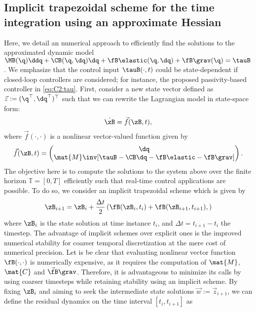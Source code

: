 \subsection{Implicit trapezoidal scheme for the time integration using an approximate Hessian}
\label{app:C2:timeint}
\noindent Here, we detail an numerical approach to efficiently find the solutions to the approximated dynamic model $\MB(\q)\ddq + \CB(\q,\dq)\dq + \fB\elastic(\q,\dq) +  \fB\grav(\q) = \tauB$. We emphasize that the control input $\tauB(\cdot,t)$ could be state-dependent if closed-loop controllers are considered; for instance, the proposed passivity-based controller in \eqref{eq:C2:tau}. First, consider a new state vector defined as $\vec{z} := ( \q^\top,\dq^\top )^\top$ such that we can rewrite the Lagrangian model in state-space form:
%
\begin{equation}
\dot{\zB} = \vec{f}(\zB,t),
\end{equation}
%
where $\vec{f}(\cdot,\cdot)$ is a nonlinear vector-valued function given by
%
\begin{equation}
\vec{f}(\zB,t) = \begin{pmatrix} \dq \\ \mat{M}\inv [\tauB - \CB\dq - \fB\elastic- \fB\grav] \end{pmatrix}.
\end{equation}
%
The objective here is to compute the solutions to the system above over the finite horizon $\mathbb{T} = [0,T]$ efficiently such that real-time control applications are possible. To do so, we consider an implicit trapezoidal scheme which is given by
%
\begin{equation}
\zB_{i+1} = \zB_{i} + \frac{\Delta t}{2} \left( \fB(\zB_{i},t_{i}) + \fB(\zB_{i+1},t_{i+1}),  \right)
\end{equation}
%
where $\zB_{i}$ is the state solution at time instance $t_{i}$, and $\Delta t = t_{i+1} - t_{i}$ the timestep. The advantage of implicit schemes over explicit ones is the improved numerical stability for coarser temporal discretization at the mere cost of numerical precision. Let is be clear that evaluating nonlinear vector function $\fB(\cdot,\cdot)$ is numerically expensive, as it requires the computation of $\mat{M}$, $\mat{C}$ and $\vec{\fB}\grav$. Therefore, it is advantageous to minimize its calls by using coarser timesteps while retaining stability using an implicit scheme. By fixing $\zB_{i}$ and aiming to seek the intermediate state solutions $\vec{w}:=\vec{z}_{i+1}$, we can define the residual dynamics on the time interval $[t_{i}, t_{i+1}]$ as
